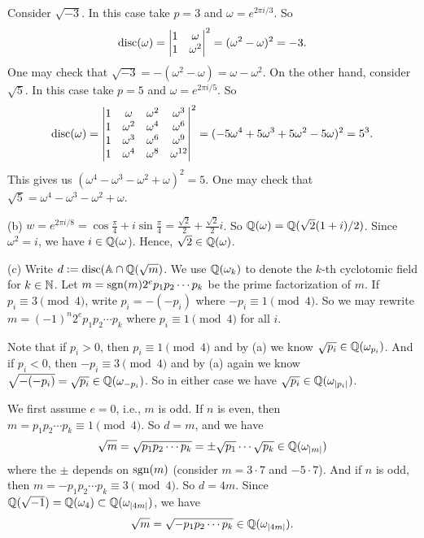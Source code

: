 \documentclass[../Marcus.tex]{subfiles}
\begin{document}
Consider $\sqrt{-3}$. In this case take $p=3$ and $\omega=e^{2\pi i/3}$. So
$$
\operatorname{disc}(\omega)=
\begin{vmatrix}
    1 & \omega \\
    1 & \omega^2
\end{vmatrix}^2
=(\omega^2-\omega)^2=-3.
$$
One may check that $\sqrt{-3}=-(\omega^2-\omega)=\omega-\omega^2$.
On the other hand, consider $\sqrt{5}$. In this case take $p=5$ and $\omega=e^{2\pi i/5}$. So
$$\operatorname{disc}(\omega)=
\begin{vmatrix}
    1 & \omega & \omega^2 & \omega^3 \\
    1 & \omega^2 & \omega^4 & \omega^6 \\
    1 & \omega^3 & \omega^6 & \omega^9 \\
    1 & \omega^4 & \omega^8 & \omega^{12} 
\end{vmatrix}^2
=(-5\omega^4+5\omega^3+5\omega^2-5\omega)^2=5^3.
$$
This gives us $(\omega^4-\omega^3-\omega^2+\omega)^2=5$. One may check that $\sqrt{5}=\omega^4-\omega^3-\omega^2+\omega$.

(b) $w=e^{2\pi i/8}=\cos\frac{\pi}{4}+i\sin\frac{\pi}{4}=\frac{\sqrt{2}}{2}+\frac{\sqrt{2}}{2}i$. So $\mathbb{Q}(\omega)=\mathbb{Q}(\sqrt{2}(1+i)/2)$. Since $\omega^2=i$, we have $i\in\mathbb{Q}(\omega$). Hence, $\sqrt{2}\in\mathbb{Q}(\omega)$. 

(c) Write $d:=\operatorname{disc}(\mathbb{A}\cap\mathbb{Q}(\sqrt{m})$. We use $\mathbb{Q}(\omega_k)$ to denote the $k$-th cyclotomic field for $k\in\mathbb{N}$. Let $m=\operatorname{sgn}(m)2^ep_1p_2\cdots p_k$ be the prime factorization of $m$. If $p_i\equiv 3 \pmod{4}$, write $p_i=-(-p_i)$ where $-p_i\equiv 1 \pmod{4}$. So we may rewrite $m=(-1)^n2^ep_1p_2\cdots p_k$ where $p_i\equiv 1 \pmod{4}$ for all $i$.

Note that if $p_i>0$, then $p_i\equiv 1 \pmod{4}$ and by (a) we know $\sqrt{p_i}\in\mathbb{Q}(\omega_{p_i})$. And if $p_i<0$, then $-p_i\equiv 3 \pmod{4}$ and by (a) again we know $\sqrt{-(-p_i)}=\sqrt{p_i} \in\mathbb{Q}(\omega_{-p_i})$. So in either case we have $\sqrt{p_i}\in\mathbb{Q}(\omega_{|p_i|})$.

We first assume $e=0$, i.e., $m$ is odd. If $n$ is even, then $m=p_1p_2\cdots p_k\equiv 1 \pmod{4}$. So $d=m$, and we have
$$\sqrt{m}=\sqrt{p_1p_2\cdots p_k}=\pm \sqrt{p_1}\cdots \sqrt{p_k}\in\mathbb{Q}(\omega_{|m|})$$ where the $\pm$ depends on $\operatorname{sgn}(m)$ (consider $m=3\cdot7$ and $-5\cdot7$). And if $n$ is odd, then $m=-p_1p_2\cdots p_k\equiv 3 \pmod{4}$. So $d=4m$. Since $\mathbb{Q}(\sqrt{-1})=\mathbb{Q}(\omega_4)\subset\mathbb{Q}(\omega_{|4m|})$, we have 
$$
\sqrt{m}=\sqrt{-p_1p_2\cdots p_k}\in\mathbb{Q}(\omega_{|4m|}).
$$
\end{document}
